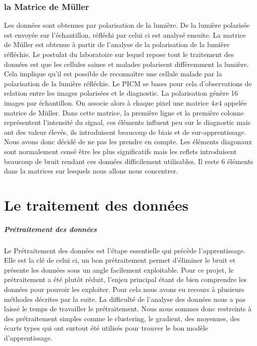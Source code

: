 \documentclass[a4paper,10pt]{report}
\begin{document}
\subsection{la Matrice de Müller}
Les données sont obtenues par polarisation de la lumière. De la lumière polarisée est envoyée sur l'échantillon, réfléchi par celui ci est analysé ensuite.
La matrice de Müller est obtenue à partir de l'analyse de la polarisation de la lumière réfléchie. Le postulat du laboratoire sur lequel repose tout le traitement des données est que les cellules saines et malades polarisent différemment la lumière. Cela implique qu'il est possible de reconnaître une cellule malade par la polarisation de la lumière réfléchie.
Le PICM se bases pour cela d'observations de relation entre les images polarisées et le diagnostic. 
La polarisation génère 16 images par échantillon. On associe alors à chaque pixel une matrice $4x4$ appelée matrice de Müller. Dans cette matrice, la première ligne et la première colonne représentent l'intensité du signal, ces éléments influent peu sur le diagnostic mais ont des valeur élevés, ils introduisent beaucoup de biais et de sur-apprentissage. Nous avons donc décidé de ne pas les prendre en compte. Les éléments diagonaux sont normalement censé être les plus significatifs mais les reflets introduisent beaucoup de bruit rendant ces données difficilement utilisables. Il reste 6 éléments dans la matrices sur lesquels nous allons nous concentrer. 


\chapter{Le traitement des données}

\paragraph{Prétraitement des données}
Le Prétraitement des données est l'étape essentielle qui précède l'apprentissage. Elle est la clé de celui ci, un bon prétraitement permet d'éliminer le bruit et présente les données sous un angle facilement exploitable. Pour ce projet, le prétraitement a été plutôt réduit, l'enjeu principal étant de bien comprendre les données pour pouvoir les exploiter. Pour cela nous avons eu recours à plusieurs méthodes décrites par la suite. La difficulté de l'analyse des données nous a pas laissé le temps de travailler le prétraitement. Nous nous sommes donc restreints à des prétraitement simples comme le clustering, le gradient, des moyennes, des écarts types qui ont surtout été utilisés pour trouver le bon modèle d'apprentissage.
\end{document}
